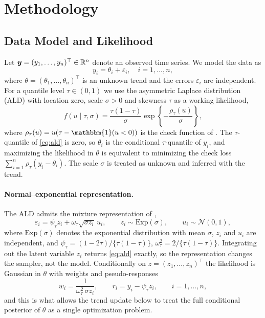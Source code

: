 \section{Methodology}
\label{sec:methodology}

\subsection{Data Model and Likelihood}
\label{subsec:model}

Let $\bm{y} = (y_1, \ldots, y_n)^\top \in \mathbb{R}^n$ denote an observed time series. We model the data as
\begin{equation}
    y_i = \theta_i + \varepsilon_i, \quad i = 1, \ldots, n,
    \label{eq:datamodel}
\end{equation}
where $\theta = (\theta_1, \ldots, \theta_n)^\top$ is an unknown trend and the errors $\varepsilon_i$ are independent. For a quantile level $\tau \in (0,1)$ we use the asymmetric Laplace distribution (ALD) with location zero, scale $\sigma > 0$ and skewness $\tau$ as a working likelihood,
\begin{equation}
    f(u \mid \tau, \sigma) = \frac{\tau(1-\tau)}{\sigma}
    \exp\!\left\{-\frac{\rho_\tau(u)}{\sigma}\right\},
    \label{eq:ald}
\end{equation}
where $\rho_\tau(u) = u(\tau - \mathbbm{1}(u < 0))$ is the check function of \citet{koenker1978regression}. The $\tau$-quantile of \eqref{eq:ald} is zero, so $\theta_i$ is the conditional $\tau$-quantile of $y_i$, and maximizing the likelihood in $\theta$ is equivalent to minimizing the check loss $\sum_{i=1}^n \rho_\tau(y_i-\theta_i)$. The scale $\sigma$ is treated as unknown and inferred with the trend.

\paragraph{Normal--exponential representation.} The ALD admits the mixture representation of \citet{kozumi2011gibbs},
\begin{equation}
    \varepsilon_i = \psi_\tau z_i + \omega_\tau \sqrt{\sigma z_i}\, u_i, \qquad z_i \sim \mathrm{Exp}(\sigma), \qquad u_i \sim \mathcal{N}(0,1),
    \label{eq:ald_mixture}
\end{equation}
where $\mathrm{Exp}(\sigma)$ denotes the exponential distribution with mean $\sigma$, $z_i$ and $u_i$ are independent, and $\psi_\tau = (1-2\tau)/\{\tau(1-\tau)\}$, $\omega_\tau^2 = 2/\{\tau(1-\tau)\}$. Integrating out the latent variable $z_i$ returns \eqref{eq:ald} exactly, so the representation changes the sampler, not the model. Conditionally on $z = (z_1,\ldots,z_n)^\top$ the likelihood is Gaussian in $\theta$ with weights and pseudo-responses
\begin{equation}
    w_i = \frac{1}{\omega_\tau^2\, \sigma z_i}, \qquad r_i = y_i - \psi_\tau z_i, \qquad i = 1,\ldots,n,
    \label{eq:weights}
\end{equation}
and this is what allows the trend update below to treat the full conditional posterior of $\theta$ as a single optimization problem.


